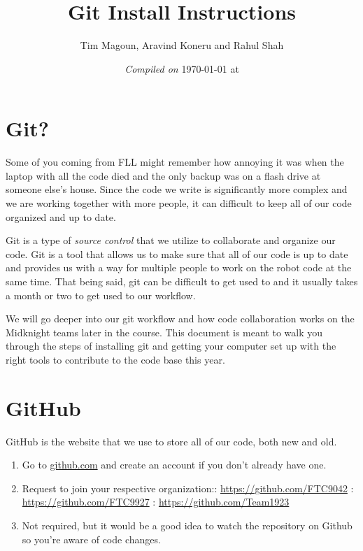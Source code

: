 \documentclass[11pt,fleqn]{article}
\begin{document}
\title{Git Install Instructions}%
\author{Tim Magoun, Aravind Koneru and Rahul Shah}
\date{\textit{Compiled on} \today \hspace{1mm} at \currenttime}
\maketitle

\section*{Git?}
Some of you coming from FLL might remember how annoying it was when the laptop with all the code died and
the only backup was on a flash drive at someone else's house. Since the code we write is
significantly more complex and we are working together with more people, it can difficult to keep
all of our code organized and up to date.

Git is a type of \textit{source control} that we utilize to collaborate and organize our code. Git is
a tool that allows us to make sure that all of our code is up to date and provides us with a way for
multiple people to work on the robot code at the same time. That being said, git can be difficult
to get used to and it usually takes a month or two to get used to our workflow.

We will go deeper into our git workflow and how code collaboration works on the Midknight
teams later in the course. This document is meant to walk you through the steps of installing git
and getting your computer set up with the right tools to contribute to the code base this year.

\section*{GitHub}
GitHub is the website that we use to store all of our code, both new and old.

\begin{enumerate}
 \item
       Go to \href{https://github.com}{github.com} and create an account if you don't already have one.

 \item
       Request to join your respective organization:: \href{https://github.com/FTC9042}{https://github.com/FTC9042} : \href{https://github.com/FTC9927}{https://github.com/FTC9927} : \href{https://github.com/Team1923}{https://github.com/Team1923}

 \item
       Not required, but it would be a good idea to watch the repository on
       Github so you're aware of code changes.

\end{enumerate}
\end{document}
